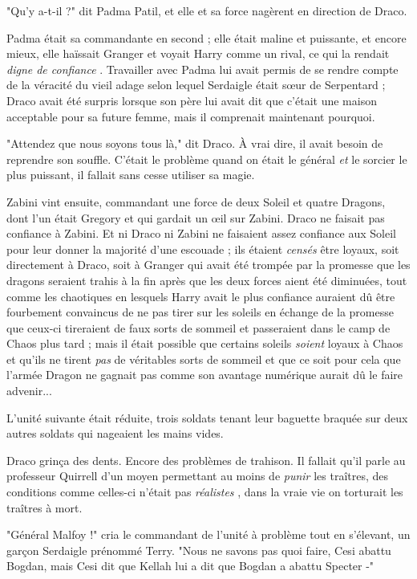 "Qu'y a-t-il ?" dit Padma Patil, et elle et sa force nagèrent en direction de Draco.

Padma était sa commandante en second ; elle était maline et puissante, et encore mieux, elle haïssait Granger et voyait Harry comme un rival, ce qui la rendait \emph{digne de confiance} . Travailler avec Padma lui avait permis de se rendre compte de la véracité du vieil adage selon lequel Serdaigle était sœur de Serpentard ; Draco avait été surpris lorsque son père lui avait dit que c'était une maison acceptable pour sa future femme, mais il comprenait maintenant pourquoi.

"Attendez que nous soyons tous là," dit Draco. À vrai dire, il avait besoin de reprendre son souffle. C'était le problème quand on était le général \emph{et } le sorcier le plus puissant, il fallait sans cesse utiliser sa magie.

Zabini vint ensuite, commandant une force de deux Soleil et quatre Dragons, dont l'un était Gregory et qui gardait un œil sur Zabini. Draco ne faisait pas confiance à Zabini. Et ni Draco ni Zabini ne faisaient assez confiance aux Soleil pour leur donner la majorité d'une escouade ; ils étaient \emph{censés}  être loyaux, soit directement à Draco, soit à Granger qui avait été trompée par la promesse que les dragons seraient trahis à la fin après que les deux forces aient été diminuées, tout comme les chaotiques en lesquels Harry avait le plus confiance auraient dû être fourbement convaincus de ne pas tirer sur les soleils en échange de la promesse que ceux-ci tireraient de faux sorts de sommeil et passeraient dans le camp de Chaos plus tard ; mais il était possible que certains soleils \emph{soient}  loyaux à Chaos et qu'ils ne tirent \emph{pas}  de véritables sorts de sommeil et que ce soit pour cela que l'armée Dragon ne gagnait pas comme son avantage numérique aurait dû le faire advenir...

L'unité suivante était réduite, trois soldats tenant leur baguette braquée sur deux autres soldats qui nageaient les mains vides.

Draco grinça des dents. Encore des problèmes de trahison. Il fallait qu'il parle au professeur Quirrell d'un moyen permettant au moins de \emph{punir}  les traîtres, des conditions comme celles-ci n'était pas \emph{réalistes} , dans la vraie vie on torturait les traîtres à mort.

"Général Malfoy !" cria le commandant de l'unité à problème tout en s'élevant, un garçon Serdaigle prénommé Terry. "Nous ne savons pas quoi faire, Cesi abattu Bogdan, mais Cesi dit que Kellah lui a dit que Bogdan a abattu Specter -"


